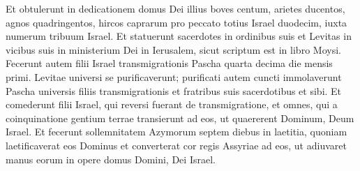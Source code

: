 \begin{biblechapter}
\begin{biblechapter}
\begin{biblechapter}
\begin{biblechapter}
\begin{biblechapter}
\begin{biblechapter}
\verse Et obtulerunt in dedicationem domus Dei illius boves centum, arietes ducentos, agnos quadringentos, hircos caprarum pro peccato totius Israel duodecim, iuxta numerum tribuum Israel. 
\verse Et statuerunt sacerdotes in ordinibus suis et Levitas in vicibus suis in ministerium Dei in Ierusalem, sicut scriptum est in libro Moysi.
 \verse Fecerunt autem filii Israel transmigrationis Pascha quarta decima die mensis primi. 
\verse Levitae universi se purificaverunt; purificati autem cuncti immolaverunt Pascha universis filiis transmigrationis et fratribus suis sacerdotibus et sibi. 
\verse Et comederunt filii Israel, qui reversi fuerant de transmigratione, et omnes, qui a coinquinatione gentium terrae transierunt ad eos, ut quaererent Dominum, Deum Israel. 
\verse Et fecerunt sollemnitatem Azymorum septem diebus in laetitia, quoniam laetificaverat eos Dominus et converterat cor regis Assyriae ad eos, ut adiuvaret manus eorum in opere domus Domini, Dei Israel.
 

\end{biblechapter}
\end{biblechapter}
\end{biblechapter}
\end{biblechapter}
\end{biblechapter}
\end{biblechapter}
